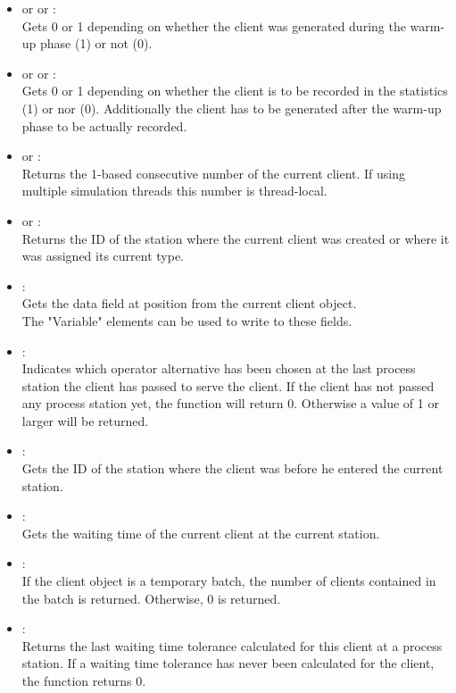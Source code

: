 \begin{itemize}

\item
{} or  or :\\
Gets 0 or 1 depending on whether the client was generated during the warm-up phase (1) or not (0).

\item
{} or  or :\\
Gets 0 or 1 depending on whether the client is to be recorded in the statistics (1) or nor (0). Additionally the client has to be generated after the warm-up phase to be actually recorded.

\item
{} or :\\
Returns the 1-based consecutive number of the current client. If using multiple simulation threads this number is thread-local.

\item
{} or :\\
Returns the ID of the station where the current client was created or where it was assigned its current type.

\item
{}:\\
Gets the data field at position  from the current client object.\\
The "Variable" elements can be used to write to these fields.

\item
{}:\\
Indicates which operator alternative has been chosen at the last process station the client has passed to serve the client. If the client has not passed any process station yet, the function will return 0. Otherwise a value of 1 or larger will be returned.

\item
{}:\\
Gets the ID of the station where the client was before he entered the current station.

\item
{}:\\
Gets the waiting time of the current client at the current station.

\item
{}:\\
If the client object is a temporary batch, the number of clients contained in the batch is returned. Otherwise, 0 is returned.

\item
{}:\\
Returns the last waiting time tolerance calculated for this client at a process station. If a waiting time tolerance has never been calculated for the client, the function returns 0.

\end{itemize}



